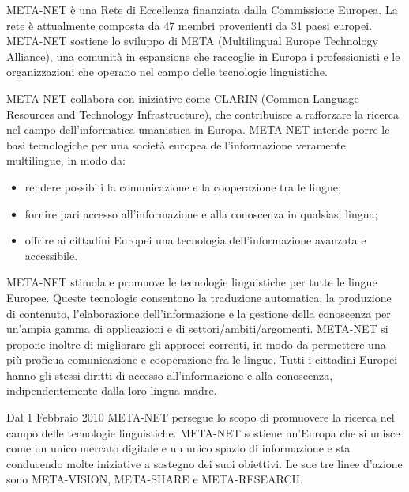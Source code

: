 \documentclass[]{../../metanetpaper}
\begin{document}
\begin{multicols}{2}

META-NET \`{e} una Rete di Eccellenza finanziata dalla Commissione Europea. La rete \`{e} attualmente composta da 47 membri provenienti da 31 paesi europei. META-NET sostiene lo sviluppo di META (Multilingual Europe Technology Alliance), una comunit\`{a} in espansione che raccoglie in Europa i professionisti e le organizzazioni che operano nel campo delle tecnologie linguistiche.

META-NET collabora con iniziative come CLARIN (Common Language Resources and Technology Infrastructure), che contribuisce a rafforzare la ricerca nel campo dell'informatica umanistica in Europa. META-NET intende porre le basi tecnologiche per una societ\`{a} europea dell'informazione veramente multilingue, in modo da:


\begin{itemize}
\item rendere possibili la comunicazione e la cooperazione tra le lingue;
\item fornire pari accesso all'informazione e alla conoscenza in qualsiasi lingua;
\item offrire ai cittadini Europei una tecnologia dell'informazione avanzata e accessibile.
\end{itemize}

META-NET stimola e promuove le tecnologie linguistiche per tutte le lingue Europee. Queste tecnologie consentono la traduzione automatica, la produzione di contenuto, l'elaborazione dell'informazione e la gestione della conoscenza per un'ampia gamma di applicazioni e di settori/ambiti/argomenti. META-NET si propone inoltre di migliorare gli approcci correnti, in modo da permettere una pi\`{u} proficua comunicazione e cooperazione fra le lingue. Tutti i cittadini Europei hanno gli stessi diritti di accesso all'informazione e alla conoscenza, indipendentemente dalla loro lingua madre.

Dal 1 Febbraio 2010 META-NET persegue lo scopo di promuovere la ricerca nel campo delle tecnologie linguistiche. META-NET sostiene un'Europa che si unisce come un unico mercato digitale e un unico spazio di informazione e sta conducendo molte iniziative a sostegno dei suoi obiettivi. Le sue tre linee d'azione sono META-VISION, META-SHARE e META-RESEARCH.



\end{multicols}
\end{document}
